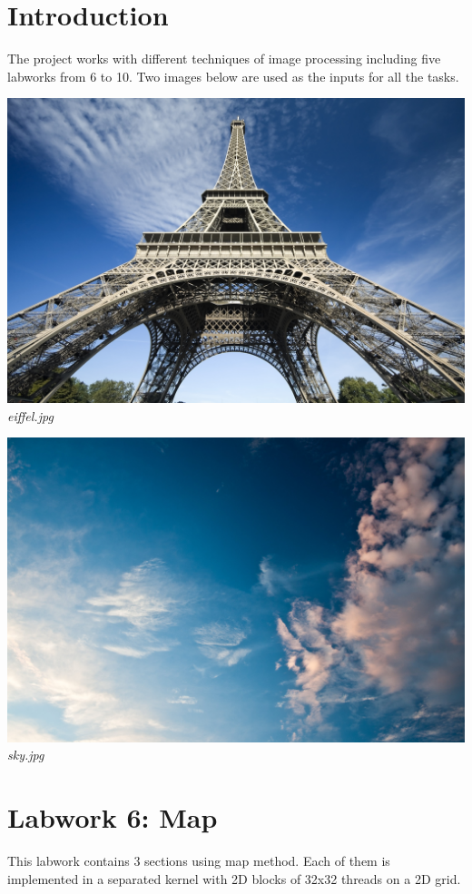 \documentclass{article}
\begin{document}
\section{Introduction}
The project works with different techniques of image processing including five labworks from 6 to 10. Two images below are used as the inputs for all the tasks. 

\begin{center}
    \includegraphics[scale=0.08]{eiffel.jpg}
    \\
    \textit{eiffel.jpg}
\end{center}
\bigskip
\begin{center}
    \includegraphics[scale=0.08]{sky.jpg}
    \\
    \textit{sky.jpg}
\end{center}
    


\section{Labwork 6: Map}
This labwork contains 3 sections using map method. Each of them is implemented in a separated kernel with 2D blocks of 32x32 threads on a 2D grid. 
\end{document}
